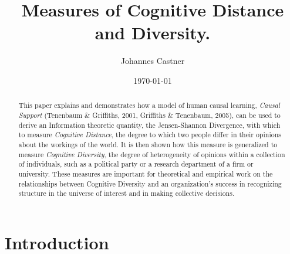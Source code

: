 \documentclass[12pt]{article}
\begin{document}
%

\title{Measures of Cognitive Distance and Diversity.}
\author{Johannes  Castner}		%

\date \today
\maketitle

\begin{abstract}
This paper explains and demonstrates how a model of human causal learning, {\it Causal Support} (Tenenbaum \& Griffiths, 2001, Griffiths \& Tenenbaum, 2005), can be used to derive an Information theoretic quantity, the Jensen-Shannon Divergence, with which to measure {\it Cognitive Distance}, the degree to which two people differ in their opinions about the workings of the world. It is then shown how this measure is generalized to measure {\it Cognitive Diversity}, the degree of heterogeneity of opinions within a collection of individuals, such as a political party or a research department of a firm or university. These measures are important for theoretical and empirical work on the relationships between Cognitive Diversity and an organization's success in recognizing structure in the universe of interest and in making collective decisions.
\end{abstract}

\newpage

\section{Introduction}

\end{document}
